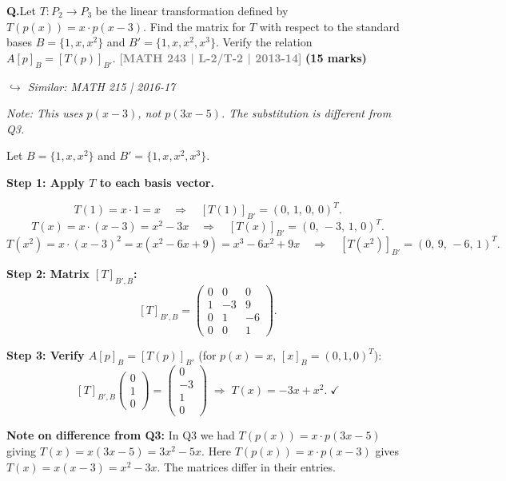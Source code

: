\documentclass[12pt,a3paper]{article}
\newcommand{\yr}[1]{\hfill\textcolor{gray}{\small\textbf{[#1]}}}
\newcommand{\mk}[1]{\textcolor{orange!70!black}{\small\textbf{(#1 marks)}}}
\newcommand{\variant}[1]{\par\vspace{1pt}\textcolor{blue!50!black}%
  {\footnotesize\textit{$\hookrightarrow$ Similar: #1}}}
\newcounter{qnum}
\newcommand{\Q}[1]{%
  \needspace{4\baselineskip}
  \refstepcounter{qnum}
  \vspace{6pt}
  \noindent\textbf{Q\theqnum.}\enspace #1\par
}
\begin{document}
\Q{Let $T: P_2 \to P_3$ be the linear transformation defined by $T(p(x)) = x \cdot p(x-3)$. Find the matrix for $T$ with respect to the standard bases $B = \{1, x, x^2\}$ and $B' = \{1, x, x^2, x^3\}$. Verify the relation $A[p]_B = [T(p)]_{B'}$.
\yr{MATH 243 | L-2/T-2 | 2013-14} \mk{15}
\variant{MATH 215 | 2016-17}}

\begin{tcolorbox}[enhanced,breakable,
  colback=cF!4,colframe=cF,boxrule=0.8pt,arc=5pt,
  title={\textbf{Answer --- $T:P_2\to P_3$, $T(p(x))=x\cdot p(x-3)$: Matrix \& Verification}},
  fonttitle=\bfseries\color{white},colbacktitle=cF]

\textit{Note: This uses $p(x-3)$, not $p(3x-5)$. The substitution is different from Q3.}

Let $B=\{1,x,x^2\}$ and $B'=\{1,x,x^2,x^3\}$.

\textbf{Step 1: Apply $T$ to each basis vector.}

\[
T(1)=x\cdot 1=x\quad\Rightarrow\quad[T(1)]_{B'}=(0,\,1,\,0,\,0)^T.
\]
\[
T(x)=x\cdot(x-3)=x^2-3x\quad\Rightarrow\quad[T(x)]_{B'}=(0,\,-3,\,1,\,0)^T.
\]
\[
T(x^2)=x\cdot(x-3)^2=x(x^2-6x+9)=x^3-6x^2+9x\quad\Rightarrow\quad[T(x^2)]_{B'}=(0,\,9,\,-6,\,1)^T.
\]

\textbf{Step 2: Matrix $[T]_{B',B}$:}
\[
[T]_{B',B}=\begin{pmatrix}0&0&0\\1&-3&9\\0&1&-6\\0&0&1\end{pmatrix}.
\]

\textbf{Step 3: Verify $A[p]_B=[T(p)]_{B'}$} (for $p(x)=x$, $[x]_B=(0,1,0)^T$):
\[
[T]_{B',B}\begin{pmatrix}0\\1\\0\end{pmatrix}=\begin{pmatrix}0\\-3\\1\\0\end{pmatrix}
\;\Rightarrow\; T(x)=-3x+x^2.\;\checkmark
\]

\textbf{Note on difference from Q3:} In Q3 we had $T(p(x))=x\cdot p(3x-5)$ giving $T(x)=x(3x-5)=3x^2-5x$. Here $T(p(x))=x\cdot p(x-3)$ gives $T(x)=x(x-3)=x^2-3x$. The matrices differ in their entries.

\end{tcolorbox}
\end{document}
